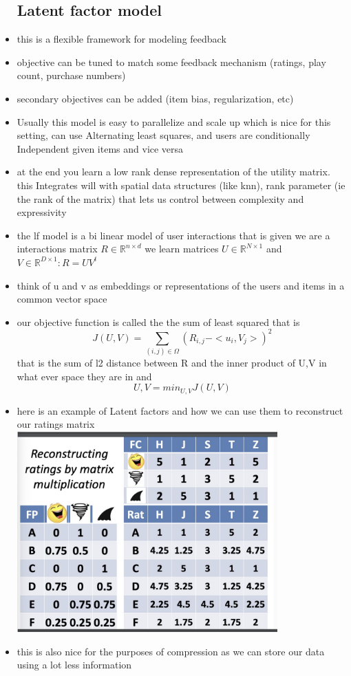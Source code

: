 \documentclass{article}
\begin{document}
\begin{itemize}
\subsection*{Latent factor model}
\item this is a flexible framework for modeling feedback
\item objective can be tuned to match some feedback mechanism (ratings, play count, purchase numbers)
\item secondary objectives can be added (item bias, regularization, etc)
\item Usually this model is easy to parallelize and scale up which is nice for this setting, can use Alternating least squares, and users are conditionally Independent given items and vice versa
\item at the end you learn a low rank dense representation of the utility matrix. this Integrates will with spatial data structures (like knn), rank parameter (ie the rank of the matrix) that lets us control between complexity and expressivity
\item the lf model is a bi linear model of user interactions that is given we are a interactions matrix $R\in \mathbb{R}^{n\times d}$ we learn matrices $U\in \mathbb{R}^{N\times 1}$ and $V\in \mathbb{R}^{D\times 1} : R=UV^{t}$ 
\item think of u and v as embeddings or representations of the users and items in a common vector space 
\item our objective function is called the the sum of least squared that is $$J(U,V)= \sum_{(i,j)\in \Omega}(R_{i,j}-<u_{i}, V_{j}>)^{2}$$ that is the sum of l2 distance between R and the inner product of U,V in what ever space they are in 
and $$U,V = min_{U,V}J(U,V)$$
\item here is an example of Latent factors and how we can use them to reconstruct our ratings matrix \\\includegraphics*[width=10cm]{images/Screenshot 2023-05-11 at 5.31.02 PM.png}
\item this is also nice for the purposes of compression as we can store our data using a lot less information 

\end{itemize}
\end{document}
